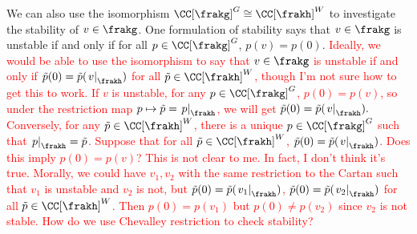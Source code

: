 We can also use the isomorphism $\CC[\frakg]^G \cong \CC[\frakh]^W$ to investigate the stability of $v \in \frakg$.
One formulation of stability says that $v \in \frakg$ is unstable if and only if for all $p \in \CC[\frakg]^G$, $p(v) = p(0)$.
\textcolor{red}{
Ideally, we would be able to use the isomorphism to say that $v \in \frakg$ is unstable if and only if $\tilde p(0) = \tilde p(\left. v \right|_\frakh)$ for all $\tilde p \in \CC[\frakh]^W$, though I'm not sure how to get this to work.
If $v$ is unstable, for any $p \in \CC[\frakg]^G$, $p(0) = p(v)$, so under the restriction map $p \mapsto \tilde p = \left. p \right|_\frakh$, we will get $\tilde p (0) = \tilde p (\left. v \right|_\frakh).$
Conversely, for any $\tilde p \in \CC[\frakh]^W$, there is a unique $p \in \CC[\frakg]^G$ such that $\left. p \right|_\frakh = \tilde p$.
Suppose that for all $\tilde p \in \CC[\frakh]^W$, $\tilde p(0) = \tilde p(\left. v \right|_\frakh)$.
Does this imply $p(0) = p(v)$? 
This is not clear to me.
In fact, I don't think it's true.
Morally, we could have $v_1, v_2$ with the same restriction to the Cartan such that $v_1$ is unstable and $v_2$ is not, but $\tilde p(0) = \tilde p (\left. v_1 \right|_\frakh)$, $\tilde p(0) = \tilde p (\left. v_2 \right|_\frakh)$ for all $\tilde p \in \CC[\frakh]^W$.
Then $p(0) = p(v_1)$ but $p(0) \ne p(v_2)$ since $v_2$ is not stable.
How do we use Chevalley restriction to check stability?
}